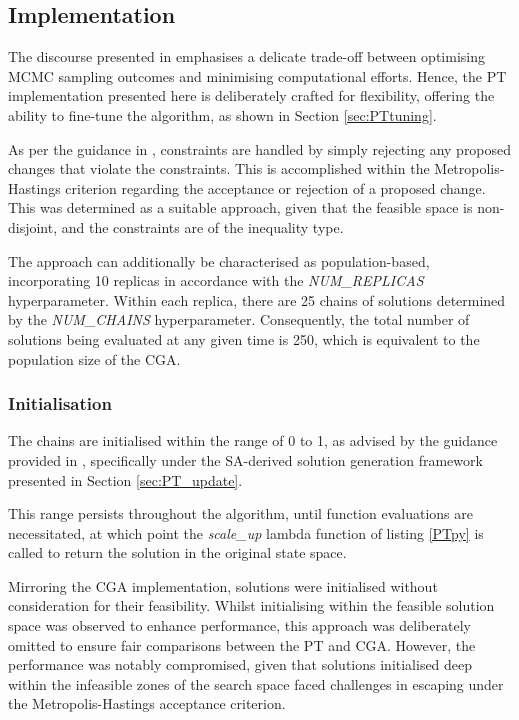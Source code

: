 \documentclass[10pt]{article}
\begin{document}
\begin{multicols}{2}
\subsection{Implementation}

The discourse presented in \cite{Earl_2005} emphasises a delicate trade-off between optimising MCMC sampling outcomes and minimising computational efforts. Hence, the PT implementation presented here is deliberately crafted for flexibility, offering the ability to fine-tune the algorithm, as shown in Section \ref{sec:PTtuning}.

As per the guidance in \cite{parks2023geneticalgorithmsSA}, constraints are handled by simply rejecting any proposed changes that violate the constraints. This is accomplished within the Metropolis-Hastings criterion regarding the acceptance or rejection of a proposed change. This was determined as a suitable approach, given that the feasible space is non-disjoint, and the constraints are of the inequality type.

The approach can additionally be characterised as population-based, incorporating 10 replicas in accordance with the \textit{NUM\_REPLICAS} hyperparameter. Within each replica, there are 25 chains of solutions determined by the \textit{NUM\_CHAINS} hyperparameter. Consequently, the total number of solutions being evaluated at any given time is 250, which is equivalent to the population size of the CGA.

\subsubsection{Initialisation}
The chains are initialised within the range of 0 to 1, as advised by the guidance provided in \cite{NT90-A34350}, specifically under the SA-derived solution generation framework presented in Section \ref{sec:PT_update}.

This range persists throughout the algorithm, until function evaluations are necessitated, at which point the \textit{scale\_up} lambda function of listing \ref{PTpy} is called to return the solution in the original state space.

Mirroring the CGA implementation, solutions were initialised without consideration for their feasibility. Whilst initialising within the feasible solution space was observed to enhance performance, this approach was deliberately omitted to ensure fair comparisons between the PT and CGA. However, the performance was notably compromised, given that solutions initialised deep within the infeasible zones of the search space faced challenges in escaping under the Metropolis-Hastings acceptance criterion.


\end{multicols}
\end{document}
